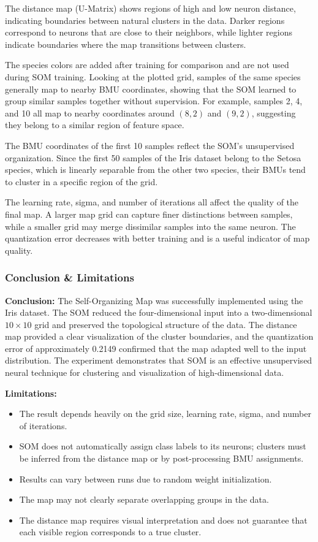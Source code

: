 \documentclass[a4paper,11pt]{article}
\begin{document}
\begin{itemize}
The distance map (U-Matrix) shows regions of high and low neuron distance, indicating boundaries between natural clusters in the data. Darker regions correspond to neurons that are close to their neighbors, while lighter regions indicate boundaries where the map transitions between clusters.

The species colors are added after training for comparison and are not used during SOM training. Looking at the plotted grid, samples of the same species generally map to nearby BMU coordinates, showing that the SOM learned to group similar samples together without supervision. For example, samples 2, 4, and 10 all map to nearby coordinates around $(8, 2)$ and $(9, 2)$, suggesting they belong to a similar region of feature space.

The BMU coordinates of the first 10 samples reflect the SOM's unsupervised organization. Since the first 50 samples of the Iris dataset belong to the Setosa species, which is linearly separable from the other two species, their BMUs tend to cluster in a specific region of the grid.

The learning rate, sigma, and number of iterations all affect the quality of the final map. A larger map grid can capture finer distinctions between samples, while a smaller grid may merge dissimilar samples into the same neuron. The quantization error decreases with better training and is a useful indicator of map quality.

\subsubsection{Conclusion \& Limitations}

\textbf{Conclusion:} The Self-Organizing Map was successfully implemented using the Iris dataset. The SOM reduced the four-dimensional input into a two-dimensional $10 \times 10$ grid and preserved the topological structure of the data. The distance map provided a clear visualization of the cluster boundaries, and the quantization error of approximately 0.2149 confirmed that the map adapted well to the input distribution. The experiment demonstrates that SOM is an effective unsupervised neural technique for clustering and visualization of high-dimensional data.

\textbf{Limitations:}
\begin{itemize}
    \item The result depends heavily on the grid size, learning rate, sigma, and number of iterations.
    \item SOM does not automatically assign class labels to its neurons; clusters must be inferred from the distance map or by post-processing BMU assignments.
    \item Results can vary between runs due to random weight initialization.
    \item The map may not clearly separate overlapping groups in the data.
    \item The distance map requires visual interpretation and does not guarantee that each visible region corresponds to a true cluster.
\end{itemize}





\end{itemize}
\end{document}
